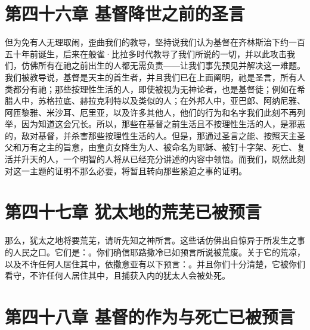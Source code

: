 
\section{第四十六章 基督降世之前的圣言}

但为免有人无理取闹，歪曲我们的教导，坚持说我们认为基督在齐林斯治下约一百五十年前诞生，后来在般雀·比拉多时代教导了我们所说的一切，并以此攻击我们，仿佛所有在祂之前出生的人都无需负责——让我们事先预见并解决这一难题。我们被教导说，基督是天主的首生者，并且我们已在上面阐明，祂是圣言，所有人类都分有祂；那些按理性生活的人，即使被视为无神论者，也是基督徒；例如在希腊人中，苏格拉底、赫拉克利特以及类似的人；在外邦人中，亚巴郎、阿纳尼雅、阿匝黎雅、米沙耳、厄里亚，以及许多其他人，他们的行为和名字我们此刻不再列举，因为知道这会冗长。所以，那些在基督之前生活且不按理性生活的人，是邪恶的，敌对基督，并杀害那些按理性生活的人。但是，那通过圣言之能、按照天主圣父和万有之主的旨意，由童贞女降生为人、被命名为耶稣、被钉十字架、死亡、复活并升天的人，一个明智的人将从已经充分讲述的内容中领悟。而我们，既然此刻对这一主题的证明不那么必要，将暂且转向那些紧迫之事的证明。\par


\section{第四十七章 犹太地的荒芜已被预言}

那么，犹太之地将要荒芜，请听先知之神所言。这些话仿佛出自惊异于所发生之事的人民之口。它们是：。你们确信耶路撒冷已如预言所说被荒废。关于它的荒凉，以及不许任何人居住其中，依撒意亚有以下预言：。并且你们十分清楚，它被你们看守，不许任何人居住其中，且捕获入内的犹太人会被处死。\par


\section{第四十八章 基督的作为与死亡已被预言}

